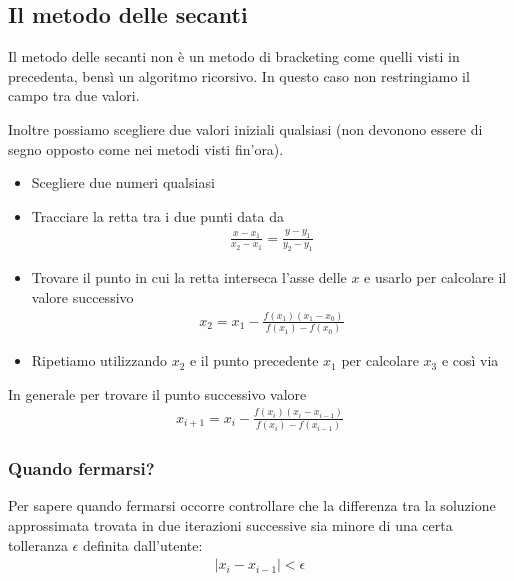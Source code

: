 \documentclass[../main.tex]{subfiles}
\begin{document}
\pagebreak
\subsection{Il metodo delle secanti}
Il metodo delle secanti non è un metodo di bracketing come quelli visti in precedenta, bensì un algoritmo ricorsivo.
In questo caso non restringiamo il campo tra due valori.

Inoltre possiamo scegliere due valori iniziali qualsiasi (non devonono essere di segno opposto come nei metodi visti fin'ora).

\begin{itemize}
    \item Scegliere due numeri qualsiasi
    \item Tracciare la retta tra i due punti data da \begin{align*}
        \frac{x - x_1}{x_2 - x_1} = \frac{y - y_1}{y_2 - y_1}
    \end{align*}
    \item Trovare il punto in cui la retta interseca l'asse delle $x$ e usarlo per calcolare il valore successivo \begin{align*}
        x_2 = x_1 - \frac{f(x_1) (x_1 - x_0)}{f(x_1) - f(x_0)}
    \end{align*}
    \item Ripetiamo utilizzando $x_2$ e il punto precedente $x_1$ per calcolare $x_3$ e così via
\end{itemize}

In generale per trovare il punto successivo valore
\begin{align*}
    x_{i+1} = x_i - \frac{f(x_i) (x_i - x_{i-1})}{f(x_i) - f(x_{i-1})}
\end{align*}

\subsubsection{Quando fermarsi?}
Per sapere quando fermarsi occorre controllare che la differenza tra la soluzione approssimata trovata in
due iterazioni successive sia minore di una certa tolleranza $\epsilon$ definita dall’utente:
\begin{align*}
    \left\lvert x_i - x_{i-1}  \right\rvert < \epsilon
\end{align*}
\end{document}
